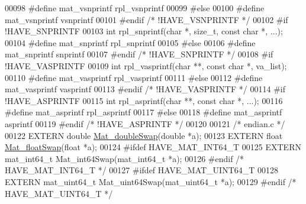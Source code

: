 \begin{DoxyCode}
00098 \textcolor{preprocessor}{#define mat\_vsnprintf rpl\_vsnprintf}
00099 \textcolor{preprocessor}{#else}
00100 \textcolor{preprocessor}{#define mat\_vsnprintf vsnprintf}
00101 \textcolor{preprocessor}{#endif }\textcolor{comment}{/* !HAVE\_VSNPRINTF */}\textcolor{preprocessor}{}
00102 \textcolor{preprocessor}{#if !HAVE\_SNPRINTF}
00103 \textcolor{keywordtype}{int} rpl\_snprintf(\textcolor{keywordtype}{char} *, \textcolor{keywordtype}{size\_t}, \textcolor{keyword}{const} \textcolor{keywordtype}{char} *, ...);
00104 \textcolor{preprocessor}{#define mat\_snprintf rpl\_snprintf}
00105 \textcolor{preprocessor}{#else}
00106 \textcolor{preprocessor}{#define mat\_snprintf snprintf}
00107 \textcolor{preprocessor}{#endif }\textcolor{comment}{/* !HAVE\_SNPRINTF */}\textcolor{preprocessor}{}
00108 \textcolor{preprocessor}{#if !HAVE\_VASPRINTF}
00109 \textcolor{keywordtype}{int} rpl\_vasprintf(\textcolor{keywordtype}{char} **, \textcolor{keyword}{const} \textcolor{keywordtype}{char} *, va\_list);
00110 \textcolor{preprocessor}{#define mat\_vasprintf rpl\_vasprintf}
00111 \textcolor{preprocessor}{#else}
00112 \textcolor{preprocessor}{#define mat\_vasprintf vasprintf}
00113 \textcolor{preprocessor}{#endif }\textcolor{comment}{/* !HAVE\_VASPRINTF */}\textcolor{preprocessor}{}
00114 \textcolor{preprocessor}{#if !HAVE\_ASPRINTF}
00115 \textcolor{keywordtype}{int} rpl\_asprintf(\textcolor{keywordtype}{char} **, \textcolor{keyword}{const} \textcolor{keywordtype}{char} *, ...);
00116 \textcolor{preprocessor}{#define mat\_asprintf rpl\_asprintf}
00117 \textcolor{preprocessor}{#else}
00118 \textcolor{preprocessor}{#define mat\_asprintf asprintf}
00119 \textcolor{preprocessor}{#endif }\textcolor{comment}{/* !HAVE\_ASPRINTF */}\textcolor{preprocessor}{}
00120 
00121 \textcolor{comment}{/* endian.c */}
00122 EXTERN \textcolor{keywordtype}{double}        \hyperlink{endian_8c_a7f548ab23c3b06fa90ef646ed43dc558}{Mat\_doubleSwap}(\textcolor{keywordtype}{double}  *a);
00123 EXTERN \textcolor{keywordtype}{float}         \hyperlink{endian_8c_aec590b585dd84bbbae74a857922fced2}{Mat\_floatSwap}(\textcolor{keywordtype}{float}   *a);
00124 \textcolor{preprocessor}{#ifdef HAVE\_MAT\_INT64\_T}
00125 EXTERN mat\_int64\_t   Mat\_int64Swap(mat\_int64\_t  *a);
00126 \textcolor{preprocessor}{#endif }\textcolor{comment}{/* HAVE\_MAT\_INT64\_T */}\textcolor{preprocessor}{}
00127 \textcolor{preprocessor}{#ifdef HAVE\_MAT\_UINT64\_T}
00128 EXTERN mat\_uint64\_t  Mat\_uint64Swap(mat\_uint64\_t *a);
00129 \textcolor{preprocessor}{#endif }\textcolor{comment}{/* HAVE\_MAT\_UINT64\_T */}\textcolor{preprocessor}{}

\end{DoxyCode}
